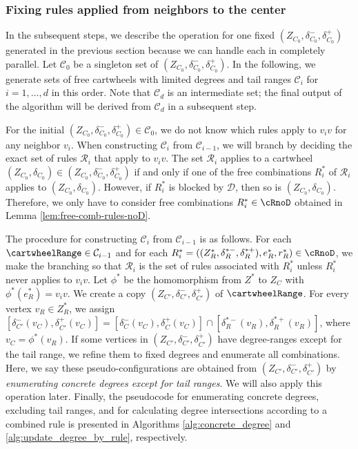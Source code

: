 \documentclass[10pt,a4paper]{article}
\def\cR{{\mathcal R}}
\def\cD{{\mathcal D}}
\begin{document}
\subsubsection{Fixing rules applied from neighbors to the center}
\label{subsub:fix_in_rules}

In the subsequent steps, we describe the operation for one fixed $(Z_{C_0}, \delta_{C_0}^-, \delta_{C_0}^+)$ generated in the previous section because we can handle each in completely parallel.
Let $\mathcal{C}_0$ be a singleton set of $(Z_{C_0}, \delta_{C_0}^-, \delta_{C_0}^+)$.
In the following, we generate sets of free cartwheels with limited degrees and tail ranges $\mathcal{C}_i$ for $i=1,\ldots,d$ in this order.
Note that $\mathcal{C}_d$ is an intermediate set; the final output of the algorithm will be derived from $\mathcal{C}_d$ in a subsequent step.

For the initial $(Z_{C_0}, \delta_{C_0}^-, \delta_{C_0}^+) \in \mathcal{C}_0$, we do not know which rules apply to $v_iv$ for any neighbor $v_i$.
When constructing $\mathcal{C}_i$ from $\mathcal{C}_{i-1}$, we will branch by deciding the exact set of rules $\mathcal{R}_i$ that apply to $v_iv$. The set $\cR_i$ applies to a cartwheel $(Z_{C_0}, \delta_{C_0})\in
(Z_{C_0}, \delta_{C_0}^-, \delta_{C_0}^+)$ if and only if one of the free combinations $R^*_i$ of $\cR_i$ applies to
$(Z_{C_0}, \delta_{C_0})$. However, if $R^*_i$ is blocked by $\cD$, then so is $(Z_{C_0}, \delta_{C_0})$. Therefore, we only have to consider free combinations
$R^*_i \in \cRnoD$ obtained in Lemma \ref{lem:free-comb-rules-noD}.

The procedure for constructing $\mathcal{C}_i$ from $\mathcal{C}_{i-1}$ is as follows.
For each $\cartwheelRange \in \mathcal{C}_{i-1}$ and for each $R_i^*=((Z_R^*, \delta_R^{*-}, \delta_R^{*+}), e_R^*, r_R^*) \in \cRnoD$, we make the branching so that $\mathcal{R}_i$ is the set of rules associated with $R_i^*$ unless $R_i^*$ never applies to $v_iv$.
Let $\phi^*$ be the homomorphism from $Z^*$ to $Z_C$ with $\phi^*(e_R^*)=v_iv$.
We create a copy $(Z_{C'}, \delta_{C'}^-, \delta_{C'}^+)$ of $\cartwheelRange$.
For every vertex $v_R \in Z_R^*$, we assign $[\delta_{C'}^-(v_C), \delta_{C'}^+(v_C)] = [\delta_{C}^-(v_C), \delta_{C}^+(v_C)] \cap [\delta_R^{*-}(v_R), \delta_R^{*+}(v_R)]$, where $v_C=\phi^*(v_R)$.
If some vertices in $(Z_{C'}, \delta_{C'}^-, \delta_{C'}^+)$ have degree-ranges except for the tail range, we refine them to fixed degrees and enumerate all combinations.
Here, we say these pseudo-configurations are obtained from $(Z_{C'}, \delta_{C'}^-, \delta_{C'}^+)$ by \emph{enumerating concrete degrees except for tail ranges}.
We will also apply this operation later.
Finally, the pseudocode for enumerating concrete degrees, excluding tail ranges, and for calculating degree intersections according to a combined rule is presented in Algorithms \ref{alg:concrete_degree} and \ref{alg:update_degree_by_rule}, respectively.
\end{document}
